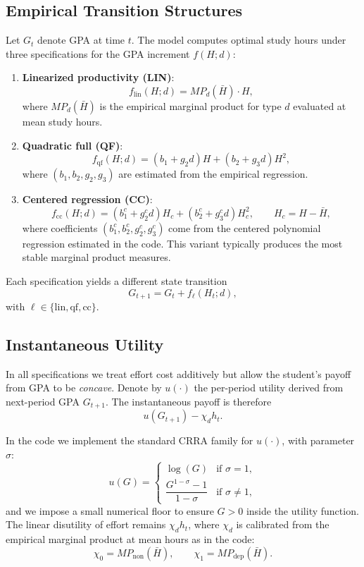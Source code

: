 \documentclass[12pt]{article}
\begin{document}
\subsection{Empirical Transition Structures}

Let $G_t$ denote GPA at time $t$. The model computes optimal study hours
under three specifications for the GPA increment $f(H;d)$:

\begin{enumerate}
    \item \textbf{Linearized productivity (LIN)}:
    \[
    f_{\mathrm{lin}}(H;d) = MP_d(\bar{H}) \cdot H,
    \]
    where $MP_d(\bar{H})$ is the empirical marginal product for type $d$
    evaluated at mean study hours.

    \item \textbf{Quadratic full (QF)}:
    \[
    f_{\mathrm{qf}}(H;d)
    =
    (b_1 + g_{2} d) H
    +
    (b_2 + g_{3} d) H^2,
    \]
    where $(b_1,b_2,g_2,g_3)$ are estimated from the empirical regression.


    \item \textbf{Centered regression (CC)}:
    \[
    f_{\mathrm{cc}}(H;d)
    =
    (b_1^c + g_2^c d) H_c
    +
    (b_2^c + g_3^c d) H_c^2,
    \qquad
    H_c = H - \bar{H},
    \]
    where coefficients $(b_1^c,b_2^c,g_2^c,g_3^c)$ come from the centered
    polynomial regression estimated in the code. This variant typically
    produces the most stable marginal product measures.
\end{enumerate}

Each specification yields a different state transition
\[
G_{t+1} = G_t + f_{\ell}(H_t;d),
\]
with $\ell \in \{\mathrm{lin},\mathrm{qf},\mathrm{cc}\}$.

\subsection{Instantaneous Utility}

In all specifications we treat effort cost additively but allow the
student's payoff from GPA to be \emph{concave}. Denote by $u(\cdot)$ the
per-period utility derived from next-period GPA $G_{t+1}$. The instantaneous
payoff is therefore
\[
u(G_{t+1}) - \chi_d h_t.
\]

In the code we implement the standard CRRA family for $u(\cdot)$, with
parameter $\sigma$:
\[
u(G) =
\begin{cases}
\log(G) & \text{if }\sigma = 1,\\[4pt]
\dfrac{G^{1-\sigma}-1}{1-\sigma} & \text{if }\sigma \neq 1,
\end{cases}
\]
and we impose a small numerical floor to ensure $G>0$ inside the utility
function. The linear disutility of effort remains $\chi_d h_t$, where
$\chi_d$ is calibrated from the empirical marginal product at mean
hours as in the code:
\[
\chi_0 = MP_{\mathrm{non}}(\bar{H}),\qquad
\chi_1 = MP_{\mathrm{dep}}(\bar{H}).
\]
\end{document}
